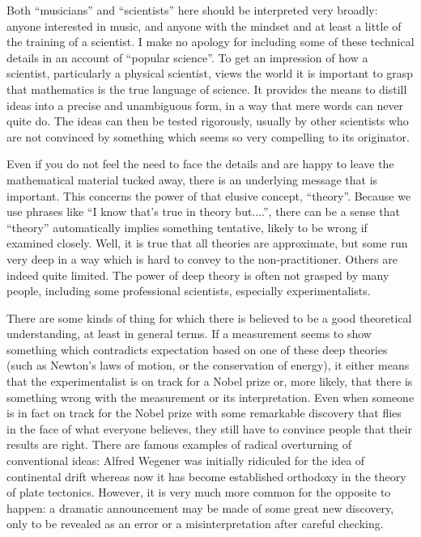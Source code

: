   Both ``musicians'' and ``scientists'' here should be interpreted very 
  broadly: anyone interested in music, and anyone with the mindset and at least 
  a little of the training of a scientist. I make no apology for including some 
  of these technical details in an account of ``popular science''. To get an 
  impression of how a scientist, particularly a physical scientist, views the 
  world it is important to grasp that mathematics is the true language of 
  science. It provides the means to distill ideas into a precise and 
  unambiguous form, in a way that mere words can never quite do. The ideas can 
  then be tested rigorously, usually by other scientists who are not convinced 
  by something which seems so very compelling to its originator. 

  Even if you do not feel the need to face the details and are happy to leave 
  the mathematical material tucked away, there is an underlying message that is 
  important. This concerns the power of that elusive concept, ``theory''. 
  Because we use phrases like ``I know that's true in theory but....'', there 
  can be a sense that ``theory'' automatically implies something tentative, 
  likely to be wrong if examined closely. Well, it is true that all theories 
  are approximate, but some run very deep in a way which is hard to convey to 
  the non-practitioner. Others are indeed quite limited. The power of deep 
  theory is often not grasped by many people, including some professional 
  scientists, especially experimentalists. 

  There are some kinds of thing for which there is believed to be a good 
  theoretical understanding, at least in general terms. If a measurement seems 
  to show something which contradicts expectation based on one of these deep 
  theories (such as Newton's laws of motion, or the conservation of energy), it 
  either means that the experimentalist is on track for a Nobel prize or, more 
  likely, that there is something wrong with the measurement or its 
  interpretation. Even when someone is in fact on track for the Nobel prize 
  with some remarkable discovery that flies in the face of what everyone 
  believes, they still have to convince people that their results are right. 
  There are famous examples of radical overturning of conventional ideas: 
  Alfred Wegener was initially ridiculed for the idea of continental drift 
  whereas now it has become established orthodoxy in the theory of plate 
  tectonics. However, it is very much more common for the opposite to happen: a 
  dramatic announcement may be made of some great new discovery, only to be 
  revealed as an error or a misinterpretation after careful checking. 

